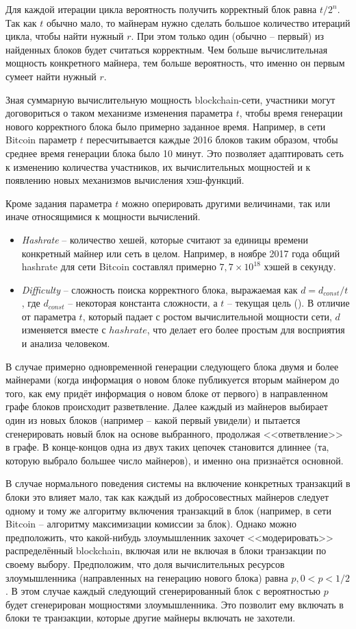 Для каждой итерации цикла вероятность получить корректный блок равна $t / 2^{n}$. Так как $t$ обычно мало, то майнерам нужно сделать большое количество итераций цикла, чтобы найти нужный $r$. При этом только один (обычно -- первый) из найденных блоков будет считаться корректным. Чем больше вычислительная мощность конкретного майнера, тем больше вероятность, что именно он первым сумеет найти нужный $r$.

Зная суммарную вычислительную мощность blockchain-сети, участники могут договориться о таком механизме изменения параметра $t$, чтобы время генерации нового корректного блока было примерно заданное время. Например, в сети Bitcoin параметр $t$ пересчитывается каждые 2016 блоков таким образом, чтобы среднее время генерации блока было 10 минут. Это позволяет адаптировать сеть к изменению количества участников, их вычислительных мощностей и к появлению новых механизмов вычисления хэш-функций.

Кроме задания параметра $t$ можно оперировать другими величинами, так или иначе относящимися к мощности вычислений.
\begin{itemize}
	\item \textit{Hashrate} -- количество хешей, которые считают за единицы времени конкретный майнер или сеть в целом. Например, в ноябре 2017 года общий hashrate для сети Bitcoin составлял примерно $7,7 \times 10^{18}$ хэшей в секунду.
	\item \textit{Difficulty} -- сложность поиска корректного блока, выражаемая как $d = d_{const} / t$, где $d_{const}$ -- некоторая константа сложности, а $t$ -- текущая цель (). В отличие от параметра $t$, который падает с ростом вычислительной мощности сети, $d$ изменяется вместе с $hashrate$, что делает его более простым для восприятия и анализа человеком.
\end{itemize}

В случае примерно одновременной генерации следующего блока двумя и более майнерами (когда информация о новом блоке публикуется вторым майнером до того, как ему придёт информация о новом блоке от первого) в направленном графе блоков происходит разветвление. Далее каждый из майнеров выбирает один из новых блоков (например -- какой первый увидели) и пытается сгенерировать новый блок на основе выбранного, продолжая <<ответвление>> в графе. В конце-концов одна из двух таких цепочек становится длиннее (та, которую выбрало большее число майнеров), и именно она признаётся основной.

В случае нормального поведения системы на включение конкретных транзакций в блоки это влияет мало, так как каждый из добросовестных майнеров следует одному и тому же алгоритму включения транзакций в блок (например, в сети Bitcoin -- алгоритму максимизации комиссии за блок). Однако можно предположить, что какой-нибудь злоумышленник захочет <<модерировать>> распределённый blockchain, включая или не включая в блоки транзакции по своему выбору. Предположим, что доля вычислительных ресурсов злоумышленника (направленных на генерацию нового блока) равна $p, 0 < p < 1/2$. В этом случае каждый следующий сгенерированный блок с вероятностью $p$ будет сгенерирован мощностями злоумышленника. Это позволит ему включать в блоки те транзакции, которые другие майнеры включать не захотели.

